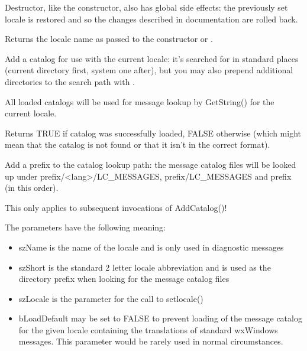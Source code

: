 \label{wxlocaledtor}


Destructor, like the constructor, also has global side effects: the previously
set locale is restored and so the changes described in 
 documentation are rolled back.

\label{wxlocalegetlocale}


Returns the locale name as passed to the constructor or 
.


\label{wxlocaleaddcatalog}


Add a catalog for use with the current locale: it's searched for in standard
places (current directory first, system one after), but you may also prepend
additional directories to the search path with 
.

All loaded catalogs will be used for message lookup by GetString() for the
current locale.

Returns TRUE if catalog was successfully loaded, FALSE otherwise (which might
mean that the catalog is not found or that it isn't in the correct format).

\label{wxlocaleaddcataloglookuppathprefix}


Add a prefix to the catalog lookup path: the message catalog files will be
looked up under prefix/<lang>/LC\_MESSAGES, prefix/LC\_MESSAGES and prefix
(in this order).

This only applies to subsequent invocations of AddCatalog()!

\label{wxlocaleinit}


The parameters have the following meaning:
\begin{itemize}\itemsep=0pt
\item szName is the name of the locale and is only used in diagnostic messages
\item szShort is the standard 2 letter locale abbreviation and is used as the
directory prefix when looking for the message catalog files
\item szLocale is the parameter for the call to setlocale()
\item bLoadDefault may be set to FALSE to prevent loading of the message catalog
for the given locale containing the translations of standard wxWindows messages.
This parameter would be rarely used in normal circumstances.
\end{itemize}

